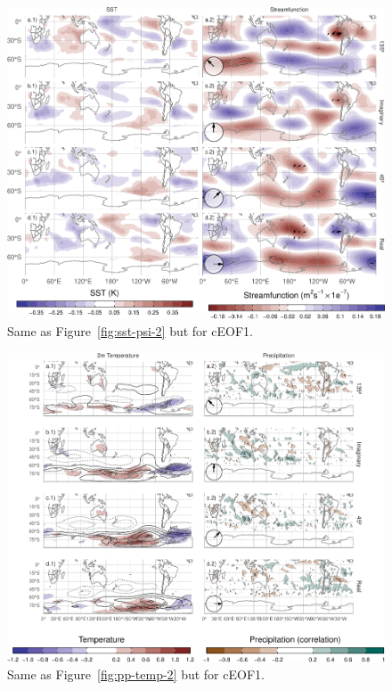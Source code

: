\documentclass[smallextended]{svjour3}       %
\begin{document}
\newpage



\begin{figure}
\includegraphics{../figures/sst-psi-1-1} \caption{Same as Figure~\ref{fig:sst-psi-2} but for cEOF1.}\label{fig:sst-psi-1}
\end{figure}



\begin{figure}
\centering
\includegraphics{../figures/pp-temp-1-1.pdf}
\caption{\label{fig:pp-temp-1}Same as Figure~\ref{fig:pp-temp-2} but for cEOF1.}
\end{figure}
\end{document}
